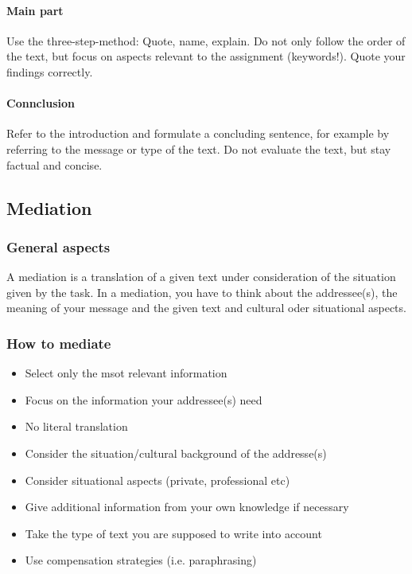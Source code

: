 \documentclass{article}
\begin{document}
	\paragraph{Main part}
	Use the three-step-method: Quote, name, explain.
	Do not only follow the order of the text, but focus on aspects relevant to the assignment (keywords!). Quote your findings correctly.

	\paragraph{Connclusion}
	Refer to the introduction and formulate a concluding sentence, for example by referring to the message or type of the text. Do not evaluate the text, but stay factual and concise.


	\subsection{Mediation}
	\subsubsection{General aspects}
	A mediation is a translation of a given text under consideration of the situation given by the task. In a mediation, you have to think about the addressee(s), the meaning of your message and the given text and cultural oder situational aspects.

	\subsubsection{How to mediate}
	\begin{itemize}
		\item Select only the msot relevant information
		\item Focus on the information your addressee(s) need
		\item No literal translation
		\item Consider the situation/cultural background of the addresse(s)
		\item Consider situational aspects (private, professional etc)
		\item Give additional information from your own knowledge if necessary
		\item Take the type of text you are supposed to write into account
		\item Use compensation strategies (i.e. paraphrasing)
	\end{itemize}
\end{document}
